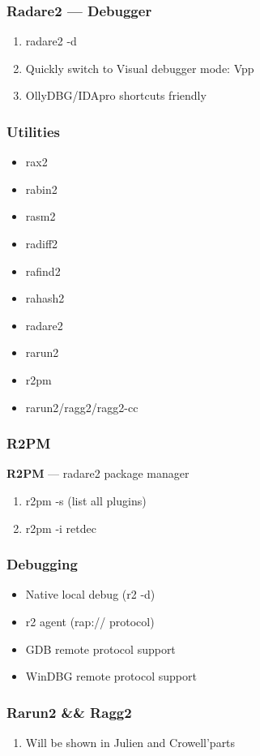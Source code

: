\documentclass[10pt,pdf,utf8,english,compress,hyperref={unicode}]{beamer}
\begin{document}
\begin{frame}[fragile]
  \frametitle{Radare2 — Debugger}
  \begin{enumerate}
  \item radare2 -d
  \item Quickly switch to Visual debugger mode: Vpp
  \item OllyDBG/IDApro shortcuts friendly
 \end{enumerate}
\end{frame}

\begin{frame}[fragile]
  \frametitle{Utilities}
     \begin{itemize}
        \item rax2
        \item rabin2
        \item rasm2
        \item radiff2
        \item rafind2
        \item rahash2
        \item radare2
        \item \alert{rarun2}
				\item r2pm
        \item rarun2/ragg2/ragg2-cc
      \end{itemize}
\end{frame}

\begin{frame}[fragile]
  \frametitle{R2PM}
	\center\textbf{R2PM} — radare2 package manager
  \noindent\makebox[\linewidth]{\rule{\paperwidth}{0.4pt}}
  \begin{enumerate}
  \item r2pm -s (list all plugins)
	\item r2pm -i retdec
 \end{enumerate}
\end{frame}
\begin{frame}[fragile]
  \frametitle{Debugging}
  \begin{itemize}
	\item Native local debug (r2 -d)
	\item r2 agent (rap:// protocol)
	\item GDB remote protocol support
	\item WinDBG remote protocol support
  \end{itemize}
\end{frame}

\begin{frame}[fragile]
  \frametitle{Rarun2 \&\& Ragg2}
  \noindent\makebox[\linewidth]{\rule{\paperwidth}{0.4pt}}
  \begin{enumerate}
  \item Will be shown in Julien and Crowell'parts
 \end{enumerate}
\end{frame}
\end{document}
